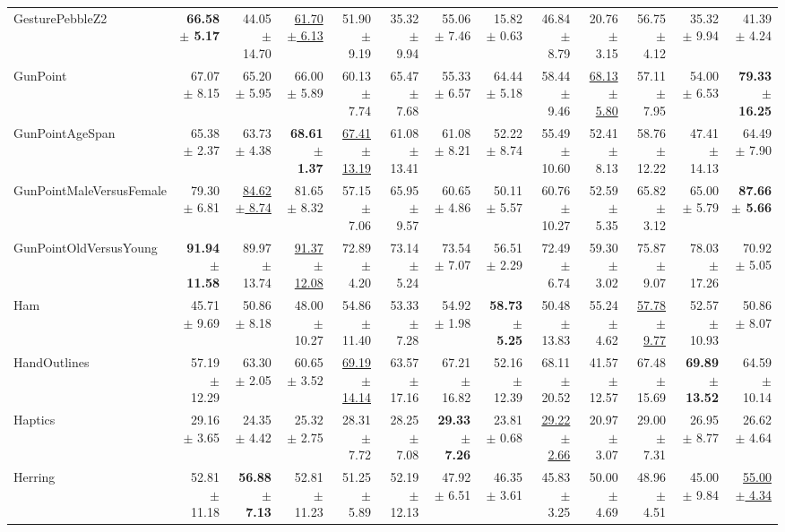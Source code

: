 \begin{landscape}
\begin{longtable}{lrrrrrrrrrrrr}
GesturePebbleZ2 & \textbf{66.58 $\pm$ 5.17} & 44.05 $\pm$ 14.70 & \underline{61.70 $\pm$ 6.13} & 51.90 $\pm$ 9.19 & 35.32 $\pm$ 9.94 & 55.06 $\pm$ 7.46 & 15.82 $\pm$ 0.63 & 46.84 $\pm$ 8.79 & 20.76 $\pm$ 3.15 & 56.75 $\pm$ 4.12 & 35.32 $\pm$ 9.94 & 41.39 $\pm$ 4.24 \\
GunPoint & 67.07 $\pm$ 8.15 & 65.20 $\pm$ 5.95 & 66.00 $\pm$ 5.89 & 60.13 $\pm$ 7.74 & 65.47 $\pm$ 7.68 & 55.33 $\pm$ 6.57 & 64.44 $\pm$ 5.18 & 58.44 $\pm$ 9.46 & \underline{68.13 $\pm$ 5.80} & 57.11 $\pm$ 7.95 & 54.00 $\pm$ 6.53 & \textbf{79.33 $\pm$ 16.25} \\
GunPointAgeSpan & 65.38 $\pm$ 2.37 & 63.73 $\pm$ 4.38 & \textbf{68.61 $\pm$ 1.37} & \underline{67.41 $\pm$ 13.19} & 61.08 $\pm$ 13.41 & 61.08 $\pm$ 8.21 & 52.22 $\pm$ 8.74 & 55.49 $\pm$ 10.60 & 52.41 $\pm$ 8.13 & 58.76 $\pm$ 12.22 & 47.41 $\pm$ 14.13 & 64.49 $\pm$ 7.90 \\
GunPointMaleVersusFemale & 79.30 $\pm$ 6.81 & \underline{84.62 $\pm$ 8.74} & 81.65 $\pm$ 8.32 & 57.15 $\pm$ 7.06 & 65.95 $\pm$ 9.57 & 60.65 $\pm$ 4.86 & 50.11 $\pm$ 5.57 & 60.76 $\pm$ 10.27 & 52.59 $\pm$ 5.35 & 65.82 $\pm$ 3.12 & 65.00 $\pm$ 5.79 & \textbf{87.66 $\pm$ 5.66} \\
GunPointOldVersusYoung & \textbf{91.94 $\pm$ 11.58} & 89.97 $\pm$ 13.74 & \underline{91.37 $\pm$ 12.08} & 72.89 $\pm$ 4.20 & 73.14 $\pm$ 5.24 & 73.54 $\pm$ 7.07 & 56.51 $\pm$ 2.29 & 72.49 $\pm$ 6.74 & 59.30 $\pm$ 3.02 & 75.87 $\pm$ 9.07 & 78.03 $\pm$ 17.26 & 70.92 $\pm$ 5.05 \\
Ham & 45.71 $\pm$ 9.69 & 50.86 $\pm$ 8.18 & 48.00 $\pm$ 10.27 & 54.86 $\pm$ 11.40 & 53.33 $\pm$ 7.28 & 54.92 $\pm$ 1.98 & \textbf{58.73 $\pm$ 5.25} & 50.48 $\pm$ 13.83 & 55.24 $\pm$ 4.62 & \underline{57.78 $\pm$ 9.77} & 52.57 $\pm$ 10.93 & 50.86 $\pm$ 8.07 \\
HandOutlines & 57.19 $\pm$ 12.29 & 63.30 $\pm$ 2.05 & 60.65 $\pm$ 3.52 & \underline{69.19 $\pm$ 14.14} & 63.57 $\pm$ 17.16 & 67.21 $\pm$ 16.82 & 52.16 $\pm$ 12.39 & 68.11 $\pm$ 20.52 & 41.57 $\pm$ 12.57 & 67.48 $\pm$ 15.69 & \textbf{69.89 $\pm$ 13.52} & 64.59 $\pm$ 10.14 \\
Haptics & 29.16 $\pm$ 3.65 & 24.35 $\pm$ 4.42 & 25.32 $\pm$ 2.75 & 28.31 $\pm$ 7.72 & 28.25 $\pm$ 7.08 & \textbf{29.33 $\pm$ 7.26} & 23.81 $\pm$ 0.68 & \underline{29.22 $\pm$ 2.66} & 20.97 $\pm$ 3.07 & 29.00 $\pm$ 7.31 & 26.95 $\pm$ 8.77 & 26.62 $\pm$ 4.64 \\
Herring & 52.81 $\pm$ 11.18 & \textbf{56.88 $\pm$ 7.13} & 52.81 $\pm$ 11.23 & 51.25 $\pm$ 5.89 & 52.19 $\pm$ 12.13 & 47.92 $\pm$ 6.51 & 46.35 $\pm$ 3.61 & 45.83 $\pm$ 3.25 & 50.00 $\pm$ 4.69 & 48.96 $\pm$ 4.51 & 45.00 $\pm$ 9.84 & \underline{55.00 $\pm$ 4.34} \\

\end{longtable}
\end{landscape}
